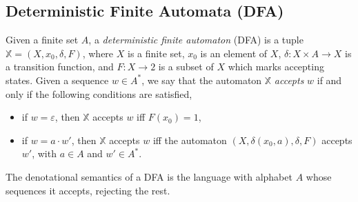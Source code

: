 \subsection{Deterministic Finite Automata (DFA)}
Given a finite set $A$, a \emph{deterministic finite automaton} (DFA) is a tuple $\mathbb{X}=(X,x_0,\delta,F)$, where $X$ is a finite set, $x_0$ is an element of $X$, $\delta\colon X\times A \rightarrow X$ is a transition function, and $F\colon X\rightarrow 2$ is a subset of $X$ which marks accepting states. Given a sequence $w\in A^*$, we say that the automaton $\mathbb{X}$ \emph{accepts} $w$ if and only if the following conditions are satisfied,
\begin{itemize}
    \item if $w=\varepsilon$, then $\mathbb{X}$ accepts $w$ iff $F(x_0)=1$, 
    \item if $w=a\cdot w'$, then $\mathbb{X}$ accepts $w$ iff the automaton $(X,\delta(x_0,a),\delta,F)$ accepts $w'$, with $a\in A$ and $w'\in A^*$.
\end{itemize}
The denotational semantics of a DFA is the language with alphabet $A$ whose sequences it accepts, rejecting the rest.

